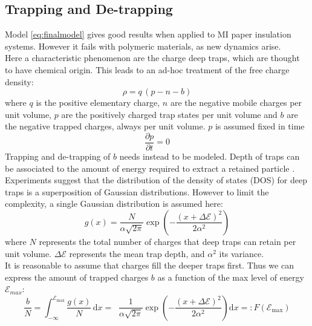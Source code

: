 \documentclass[11pt,a4paper]{article}
\begin{document}
\subsection{Trapping and De-trapping}
Model \eqref{eq:finalmodel} gives good results when applied to MI paper insulation systems. However it fails with polymeric materials, as new dynamics arise.\\
Here a characteristic phenomenon are the charge deep traps, which are thought to have chemical origin. This leads to an ad-hoc treatment of the free charge density:
\begin{equation}\label{eq:freechargetraps}
	\rho = q\,(p-n-b)
\end{equation}
where \(q\) is the positive elementary charge, \(n\) are the negative mobile charges per unit volume, \(p\) are the positively charged trap states per unit volume and \(b\) are the negative trapped charges, always per unit volume. \(p\) is assumed fixed in time
\begin{equation}
	\dfrac{\partial p}{\partial t} = 0
\end{equation}
Trapping and de-trapping of \(b\) needs instead to be modeled. Depth of traps can be associated to the amount of energy required to extract a retained particle \cite{circuitalmodel}. Experiments suggest that the distribution of the density of states (DOS)  for deep traps is a superposition of Gaussian distributions. However to limit the complexity, a single Gaussian distribution is assumed here:
\begin{equation}
	g(x) = \dfrac{N}{\alpha \sqrt{2 \pi}} \exp \left( -\dfrac{\left(x+\Delta \mathcal{E}\right)^{2}}
	{2 \alpha^{2}} \right)
\end{equation}
where \(N\) represents the total number of charges that deep traps can retain per unit volume. \(\Delta \mathcal{E}\) represents the mean trap depth, and \(\alpha^2\) its variance.\\
It is reasonable to assume that charges fill the deeper traps first. Thus we can express the amount of trapped charges \(b\) as a function of the max level of energy \(\mathcal{E}_{max}\):
\begin{equation}
	\dfrac{b}{N} = \displaystyle \int_{-\infty}^{\mathcal{E}_{\mathrm{max}}} \dfrac{g(x)}{N}\, \mathrm{d}x =
	\mathop{\int_{-\infty}^{\mathcal{E}_{\mathrm{max}}}} \frac{1}{\alpha \sqrt{2 \pi}} \exp \left( -\dfrac{\left(x+\Delta \mathcal{E}\right)^{2}}
	{2 \alpha^{2}} \right)\mathrm{d}x
	=: F\left(\mathcal{E}_{\mathrm{max}}\right)
\end{equation}
\end{document}
